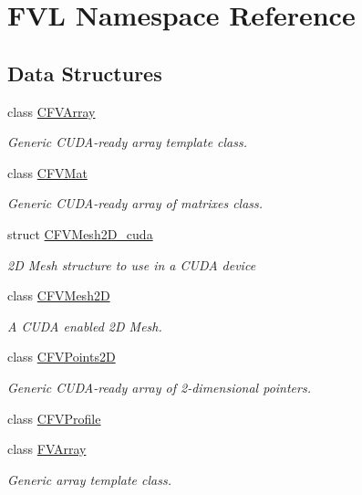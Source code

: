 \hypertarget{namespaceFVL}{
\section{FVL Namespace Reference}
\label{dd/d11/namespaceFVL}
}
\subsection*{Data Structures}
\begin{DoxyCompactItemize}
\item 
class \hyperlink{classFVL_1_1CFVArray}{CFVArray}
\begin{DoxyCompactList}\small\item\em Generic CUDA-\/ready array template class. \item\end{DoxyCompactList}\item 
class \hyperlink{classFVL_1_1CFVMat}{CFVMat}
\begin{DoxyCompactList}\small\item\em Generic CUDA-\/ready array of matrixes class. \item\end{DoxyCompactList}\item 
struct \hyperlink{structFVL_1_1CFVMesh2D__cuda}{CFVMesh2D\_\-cuda}
\begin{DoxyCompactList}\small\item\em 2D Mesh structure to use in a CUDA device \item\end{DoxyCompactList}\item 
class \hyperlink{classFVL_1_1CFVMesh2D}{CFVMesh2D}
\begin{DoxyCompactList}\small\item\em A CUDA enabled 2D Mesh. \item\end{DoxyCompactList}\item 
class \hyperlink{classFVL_1_1CFVPoints2D}{CFVPoints2D}
\begin{DoxyCompactList}\small\item\em Generic CUDA-\/ready array of 2-\/dimensional pointers. \item\end{DoxyCompactList}\item 
class \hyperlink{classFVL_1_1CFVProfile}{CFVProfile}
\item 
class \hyperlink{classFVL_1_1FVArray}{FVArray}
\begin{DoxyCompactList}\small\item\em Generic array template class. \item\end{DoxyCompactList}\item 

\end{DoxyCompactItemize}
